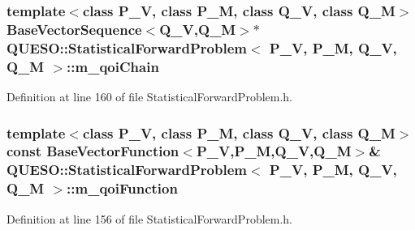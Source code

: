 \hypertarget{class_q_u_e_s_o_1_1_statistical_forward_problem_a0c7b7ce063c82ed96ea0a75d119a677a}{
\subsubsection[{m\-\_\-qoi\-Chain}]{\setlength{\rightskip}{0pt plus 5cm}template$<$class P\-\_\-\-V, class P\-\_\-\-M, class Q\-\_\-\-V, class Q\-\_\-\-M$>$ {\bf Base\-Vector\-Sequence}$<$Q\-\_\-\-V,Q\-\_\-\-M$>$$\ast$ {\bf Q\-U\-E\-S\-O\-::\-Statistical\-Forward\-Problem}$<$ P\-\_\-\-V, P\-\_\-\-M, Q\-\_\-\-V, Q\-\_\-\-M $>$\-::m\-\_\-qoi\-Chain\hspace{0.3cm}{\ttfamily [private]}}}\label{class_q_u_e_s_o_1_1_statistical_forward_problem_a0c7b7ce063c82ed96ea0a75d119a677a}


Definition at line 160 of file Statistical\-Forward\-Problem.\-h.

\hypertarget{class_q_u_e_s_o_1_1_statistical_forward_problem_af267c75bf676bb857db1ff45fe5e4484}{
\subsubsection[{m\-\_\-qoi\-Function}]{\setlength{\rightskip}{0pt plus 5cm}template$<$class P\-\_\-\-V, class P\-\_\-\-M, class Q\-\_\-\-V, class Q\-\_\-\-M$>$ const {\bf Base\-Vector\-Function}$<$P\-\_\-\-V,P\-\_\-\-M,Q\-\_\-\-V,Q\-\_\-\-M$>$\& {\bf Q\-U\-E\-S\-O\-::\-Statistical\-Forward\-Problem}$<$ P\-\_\-\-V, P\-\_\-\-M, Q\-\_\-\-V, Q\-\_\-\-M $>$\-::m\-\_\-qoi\-Function\hspace{0.3cm}{\ttfamily [private]}}}\label{class_q_u_e_s_o_1_1_statistical_forward_problem_af267c75bf676bb857db1ff45fe5e4484}


Definition at line 156 of file Statistical\-Forward\-Problem.\-h.

